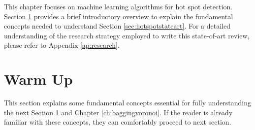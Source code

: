 This chapter focuses on machine learning algorithms for hot spot detection. Section \ref{sec:warmup} provides a brief introductory overview to explain the fundamental concepts needed to understand Section \ref{sec:hotspotstateart}. For a detailed understanding of the research strategy employed to write this state-of-art review, please refer to Appendix \ref{ap:research}. 

\section{Warm Up}
\label{sec:warmup}
This section explains some fundamental concepts essential for fully understanding the next Section \ref{sec:warmup} and Chapter \ref{ch:baggingvoronoi}. If the reader is already familiar with these concepts, they can comfortably proceed to next section. 

